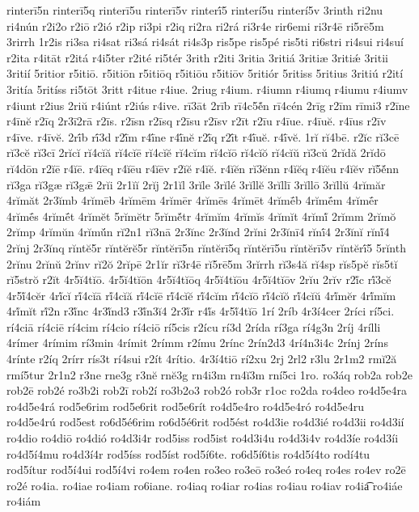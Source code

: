 {rinterī5n
rinterī5q
rinterī5u
rinterī5v
rinterī́5
rinterí5u
rinterí5v
3rinth
ri2nu
ri4nún
r2i2o
r2iō
r2ió
r2ip
ri3pi
r2iq
ri2ra
ri2rá
ri3r4e
rir6emi
ri3r4ē
ri5rē5m
3rirrh
1r2is
ri3sa
ri4sat
ri3sá
ri4sát
ri4s3p
ris5pe
ris5pé
ris5ti
ri6stri
ri4sui
ri4suí
r2ita
r4itāt
r2itá
r4i5ter
r2ité
ri5tér
3rith
r2iti
3ritia
3ritiá
3ritiæ
3ritiǽ
3ritii
3ritií
5ritior
r5itiō.
r5itiōn
r5itiōq
r5itiōu
r5itiōv
5ritiór
5ritiss
5ritius
3ritiú
r2ití
3ritía
5ritíss
ri5tōt
3ritt
r4itue
r4iue.
2riug
r4ium.
r4iumn
r4iumq
r4iumu
r4iumv
r4iunt
r2ius
2riŭ
r4iúnt
r2iús
r4ive.
rī3āt
2rīb
rī4c5ĕ́n
rī4cén
2rīg
r2īm
rīmi3
r2īne
r4īnĕ
r2īq
2r3ī2rā
r2īs.
r2īsn
r2īsq
r2īsu
r2īsv
r2īt
r2īu
r4īue.
r4īuĕ.
r4īus
r2īv
r4īve.
r4īvĕ.
2rī́b
rī́3d
r2ī́m
r4ī́ne
r4ī́nĕ
r2ī́q
r2ī́t
r4ī́uĕ.
r4ī́vĕ.
1rĭ
rĭ4bē.
r2ĭc
rĭ3cē
rĭ3cĕ
rĭ3cī
2rĭcĭ
rĭ4cĭă
rĭ4cĭē
rĭ4cĭĕ
rĭ4cĭm
rĭ4cĭō
rĭ4cĭŏ
rĭ4cĭŭ
rĭ3cŭ
2rĭdă
2rĭdō
rĭ4dōn
r2ĭē
r4ĭē.
r4ĭēq
r4ĭēu
r4ĭēv
r2ĭĕ
r4ĭĕ.
r4ĭĕn
rĭ3ĕnn
r4ĭĕq
r4ĭĕu
r4ĭĕv
rĭ5ĕ́nn
rĭ3ga
rĭ3gæ
rĭ3gǣ
2rĭi
2r1ĭĭ
2rĭj
2r1ĭl
3rĭle
3rĭlé
3rĭllĕ
3rĭllī
3rĭllō
3rĭllŭ
4rĭmăr
4rĭmăt
2r3ĭmb
4rĭmēb
4rĭmēm
4rĭmēr
4rĭmēs
4rĭmēt
4rĭmḗb
4rĭmḗm
4rĭmḗr
4rĭmḗs
4rĭmḗt
4rĭmĕt
5rĭmĕtr
5rĭmĕ́tr
4rĭmĭm
4rĭmĭs
4rĭmĭt
4rĭmĭ́
2rĭmm
2rĭmŏ
2rĭmp
4rĭmŭn
4rĭmŭ́n
rĭ2n1
rĭ3nā
2r3ĭnc
2r3ĭnd
2rĭni
2r3ĭnī4
rĭnī́4
2r3ĭnĭ
rĭnĭ́4
2rĭnj
2r3ĭnq
rĭntĕ5r
rĭntĕrĕ5r
rĭntĕrī5n
rĭntĕrī5q
rĭntĕrī5u
rĭntĕrī5v
rĭntĕrī́5
5rĭnth
2rĭnu
2rĭnŭ
2rĭnv
rĭ2ŏ
2rĭpē
2r1ĭr
rĭ3r4ē
rĭ5rē5m
3rĭrrh
rĭ3s4ă
rĭ4sp
rĭs5pĕ
rĭs5tĭ
rĭ5strŏ
r2ĭt
4r5ĭ4tĭō.
4r5ĭ4tĭōn
4r5ĭ4tĭōq
4r5ĭ4tĭōu
4r5ĭ4tĭōv
2rĭu
2rĭv
r2ĭ́c
rĭ́3cĕ
4r5ĭ́4cĕr
4rĭ́cĭ
rĭ́4cĭā
rĭ́4cĭă
rĭ́4cĭē
rĭ́4cĭĕ
rĭ́4cĭm
rĭ́4cĭō
rĭ́4cĭŏ
rĭ́4cĭŭ
4rĭ́mĕr
4rĭ́mĭm
4rĭ́mĭt
rĭ́2n
r3ĭ́nc
4r3ĭ́nd3
r3ĭ́n3ĭ4
2r3ĭ́r
r4ĭ́s
4r5ĭ́4tĭō
1rí
2ríb
4r3í4cer
2ríci
rí5ci.
rí4ciā
rí4ciē
rí4cim
rí4cio
rí4ciō
rí5cis
r2ícu
rí3d
2rída
rí3ga
rí4g3n
2ríj
4rílli
4rímer
4rímim
rí3min
4rímit
2rímm
r2ímu
2rínc
2rín2d3
4rí4n3i4c
2rínj
2ríns
4rínte
r2íq
2rírr
rís3t
rí4sui
r2ít
4rítio.
4r3í4tiō
rí2xu
2rj
2rl2
r3lu
2r1m2
rmĭ2ă
rmí5tur
2r1n2
r3ne
rne3g
r3nĕ
rnĕ3g
rn4i3m
rn4ĭ3m
rní5ci
1ro.
ro3áq
rob2a
rob2e
rob2ē
rob2é
ro3b2i
rob2ī
rob2í
ro3b2o3
rob2ó
rob3r
r1oc
ro2da
ro4deo
ro4d5e4ra
ro4d5e4rá
rod5e6rim
rod5e6rit
rod5e6rít
ro4d5e4ro
ro4d5e4ró
ro4d5e4ru
ro4d5e4rú
rod5est
ro6d5é6rim
ro6d5é6rit
rod5ést
ro4d3ie
ro4d3ié
ro4d3ii
ro4d3ií
ro4dio
ro4diō
ro4dió
ro4d3i4r
rod5iss
rod5ist
ro4d3i4u
ro4d3i4v
ro4d3íe
ro4d3íi
ro4d5í4mu
ro4d3í4r
rod5íss
rod5íst
rod5í6te.
ro6d5í6tis
ro4d5í4to
rodí4tu
rod5ítur
rod5í4ui
rod5í4vi
ro4em
ro4en
ro3eo
ro3eō
ro3eó
ro4eq
ro4es
ro4ev
ro2ē
ro2é
ro4ia.
ro4iae
ro4iam
ro6iane.
ro4iaq
ro4iar
ro4ias
ro4iau
ro4iav
ro4ia͡
ro4iáe
ro4iám
}
